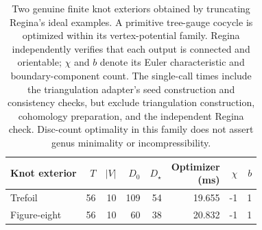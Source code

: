 \begin{table}[H]
\centering\footnotesize
\setlength{\tabcolsep}{3pt}
\renewcommand{\arraystretch}{1.12}
\begin{tabular*}{\linewidth}{@{\extracolsep{\fill}}lrrrrrrr@{}}
\toprule
Knot exterior & $T$ & $|V|$ & $D_0$ & $D_\star$ & \shortstack{Optimizer\\(ms)} & $\chi$ & $b$\\
\midrule
Trefoil & 56 & 10 & 109 & 54 & 19.655 & -1 & 1\\
Figure-eight & 56 & 10 & 60 & 38 & 20.832 & -1 & 1\\
\bottomrule
\end{tabular*}
\caption{Two genuine finite knot exteriors obtained by truncating Regina's ideal examples. A primitive tree-gauge cocycle is optimized within its vertex-potential family. Regina independently verifies that each output is connected and orientable; $\chi$ and $b$ denote its Euler characteristic and boundary-component count. The single-call times include the triangulation adapter's seed construction and consistency checks, but exclude triangulation construction, cohomology preparation, and the independent Regina check. Disc-count optimality in this family does not assert genus minimality or incompressibility.}
\label{tab:cocycle-exteriors}
\end{table}
